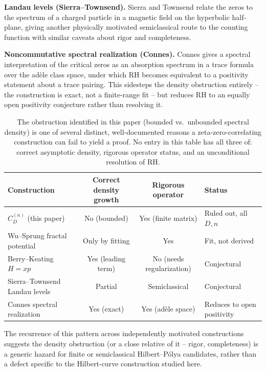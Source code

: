 \documentclass[11pt,a4paper]{article}
\begin{document}
\textbf{Landau levels (Sierra--Townsend).} Sierra and Townsend
\cite{sierratownsend2008} relate the zeros to the spectrum of a
charged particle in a magnetic field on the hyperbolic half-plane, giving
another physically motivated semiclassical route to the counting function
with similar caveats about rigor and completeness.

\textbf{Noncommutative spectral realization (Connes).} Connes
\cite{connes1999} gives a spectral interpretation of the critical zeros as
an absorption spectrum in a trace formula over the ad\`{e}le class space,
under which RH becomes equivalent to a positivity statement about a trace
pairing. This sidesteps the density obstruction entirely -- the
construction is exact, not a finite-range fit -- but reduces RH to an
equally open positivity conjecture rather than resolving it.

\begin{table}[h]
\centering
\small
\begin{tabular}{lccl}
\toprule
Construction & Correct density growth & Rigorous operator & Status\\
\midrule
$C_D^{(n)}$ (this paper) & No (bounded) & Yes (finite matrix) & Ruled out, all $D,n$\\
Wu--Sprung fractal potential & Only by fitting & Yes & Fit, not derived\\
Berry--Keating $H=xp$ & Yes (leading term) & No (needs regularization) & Conjectural\\
Sierra--Townsend Landau levels & Partial & Semiclassical & Conjectural\\
Connes spectral realization & Yes (exact) & Yes (ad\`{e}le space) & Reduces to open positivity\\
\bottomrule
\end{tabular}
\caption{The obstruction identified in this paper (bounded vs.\ unbounded
spectral density) is one of several distinct, well-documented reasons a
zeta-zero-correlating construction can fail to yield a proof. No entry in
this table has all three of: correct asymptotic density, rigorous
operator status, and an unconditional resolution of RH.}
\label{tab:related}
\end{table}

The recurrence of this pattern across independently motivated constructions
suggests the density obstruction (or a close relative of it -- rigor,
completeness) is a generic hazard for finite or semiclassical
Hilbert--P\'{o}lya candidates, rather than a defect specific to the
Hilbert-curve construction studied here.
\end{document}
